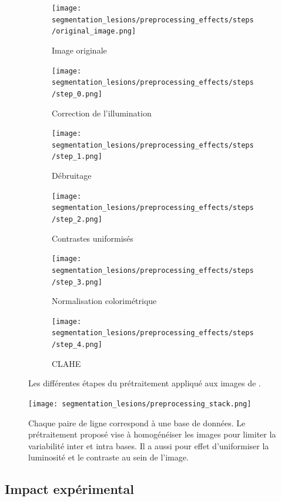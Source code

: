 \begin{figure}[!htb]
	\centering
	\begin{subfigure}{.33\textwidth}
		\texttt{[image: segmentation\_lesions/preprocessing\_effects/steps/original\_image.png]}
		\caption{Image originale}
	\end{subfigure}%
	\begin{subfigure}{.33\textwidth}
		\texttt{[image: segmentation\_lesions/preprocessing\_effects/steps/step\_0.png]}
		\caption{Correction de l'illumination}
	\end{subfigure}
	\begin{subfigure}{.33\textwidth}
		\texttt{[image: segmentation\_lesions/preprocessing\_effects/steps/step\_1.png]}
		\caption{Débruitage}
	\end{subfigure}%
	
	\begin{subfigure}{.33\textwidth}
		\texttt{[image: segmentation\_lesions/preprocessing\_effects/steps/step\_2.png]}
		\caption{Contrastes uniformisés}
	\end{subfigure}%
	\begin{subfigure}{.33\textwidth}
		\texttt{[image: segmentation\_lesions/preprocessing\_effects/steps/step\_3.png]}
		\caption{Normalisation colorimétrique}
	\end{subfigure}
	\begin{subfigure}{.33\textwidth}
		\texttt{[image: segmentation\_lesions/preprocessing\_effects/steps/step\_4.png]}
		\caption{\ac{CLAHE}}
	\end{subfigure}%
	
	\caption[short]{Les différentes étapes du prétraitement appliqué aux images de \fundus.}
	\label{fig:preprocessingSteps}
\end{figure}

\begin{figure}[!h]
	\centering
	\texttt{[image: segmentation\_lesions/preprocessing\_stack.png]}
	\caption{Chaque paire de ligne correspond à une base de données. Le prétraitement proposé vise à homogénéiser les images pour limiter la variabilité inter et intra bases. Il a aussi pour effet d'uniformiser la luminosité et le contraste au sein de l'image.}
	\label{fig:color_variability_datasets}
\end{figure}


\subsection{Impact expérimental}

